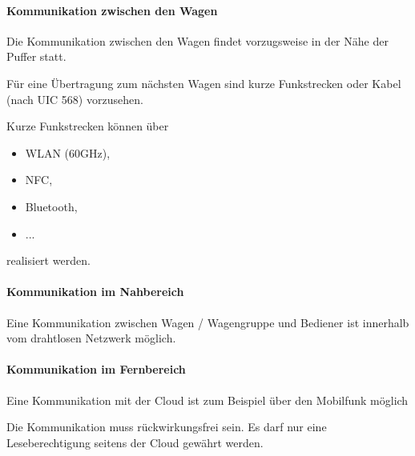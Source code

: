 \paragraph{Kommunikation zwischen den Wagen}
\begin{feat}
Die Kommunikation zwischen den Wagen findet vorzugsweise in der Nähe der Puffer statt.
\end{feat}
\begin{feat}
Für eine Übertragung zum nächsten Wagen sind kurze Funkstrecken oder Kabel (nach UIC 568) vorzusehen.
\end{feat}
\begin{rem}[zu Anf. 37]
Kurze Funkstrecken können über
\begin{itemize}
    \item WLAN (60GHz),
    \item NFC,
    \item Bluetooth,
    \item ...
\end{itemize}
realisiert werden.
\end{rem}

\paragraph{Kommunikation im Nahbereich}
\begin{feat}
Eine Kommunikation zwischen Wagen / Wagengruppe und Bediener ist innerhalb vom drahtlosen Netzwerk möglich.
\end{feat}

\paragraph{Kommunikation im Fernbereich}
\begin{feat}
Eine Kommunikation mit der Cloud ist zum Beispiel über den Mobilfunk möglich
\end{feat}
\begin{feat}
Die Kommunikation muss rückwirkungsfrei sein. Es darf nur eine Leseberechtigung seitens der Cloud gewährt werden.
\end{feat}

